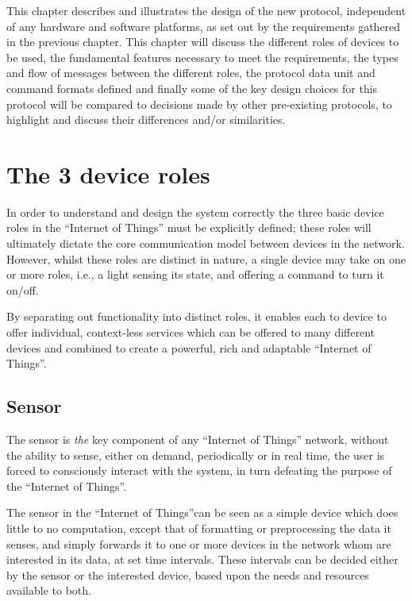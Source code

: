\newlength{\maxheight}

\newcommand{\baselinealign}[1]{%
	\centering
	\raisebox{0pt}[\maxheight][0pt]{#1}%
}


This chapter describes and illustrates the design of the new protocol, independent of any hardware and software platforms, as set out by the requirements gathered in the previous chapter. This chapter will discuss the different roles of devices to be used, the fundamental features necessary to meet the requirements, the types and flow of messages between the different roles, the protocol data unit and command formats defined and finally some of the key design choices for this protocol will be compared to decisions made by other pre-existing protocols, to highlight and discuss their differences and/or similarities.

\section{The 3 device roles} %
\label{sec:the_3_classifications_of_devices}
In order to understand and design the system correctly the three basic device roles in the ``Internet of Things'' must be explicitly defined; these roles will ultimately dictate the core communication model between devices in the network. However, whilst these roles are distinct in nature, a single device may take on one or more roles, i.e., a light sensing its state, and offering a command to turn it on/off.

By separating out functionality into distinct roles, it enables each to device to offer individual, context-less services which can be offered to many different devices and combined to create a powerful, rich and adaptable ``Internet of Things''.

\subsection{Sensor} %
\label{sub:sensor}
The sensor is \textit{the} key component of any ``Internet of Things'' network, without the ability to sense, either on demand, periodically or in real time, the user is forced to consciously interact with the system, in turn defeating the purpose of the ``Internet of Things''.

The sensor in the ``Internet of Things''can be seen as a simple device which does little to no computation, except that of formatting or preprocessing the data it senses, and simply forwards it to one or more devices in the network whom are interested in its data, at set time intervals. These intervals can be decided either by the sensor or the interested device, based upon the needs and resources available to both.

